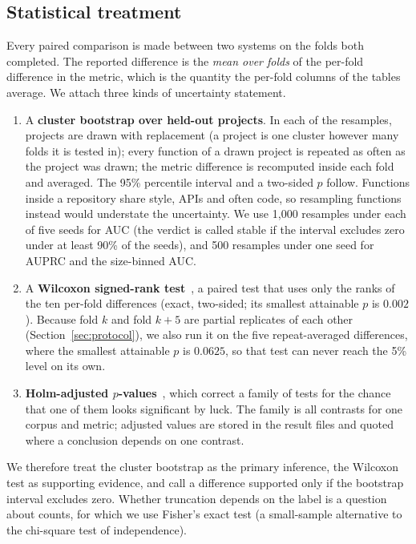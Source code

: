 \documentclass[pdflatex,sn-basic]{sn-jnl}
\theoremstyle{thmstyleone}%
\begin{document}
\subsection{Statistical treatment}
\label{sec:stats}
Every paired comparison is made between two systems on the folds both
completed. The reported difference is the \emph{mean over folds} of the
per-fold difference in the metric, which is the quantity the per-fold columns of
the tables average. We attach three kinds of uncertainty statement.
\begin{enumerate}
    \item A \textbf{cluster bootstrap over held-out projects}. In each of the
          resamples, projects are drawn with replacement (a project is one
          cluster however many folds it is tested in); every function of a drawn
          project is repeated as often as the project was drawn; the metric
          difference is recomputed inside each fold and averaged. The 95\%
          percentile interval and a two-sided $p$ follow. Functions inside a
          repository share style, APIs and often code, so resampling functions
          instead would understate the uncertainty. We use 1{,}000 resamples
          under each of five seeds for AUC (the verdict is called stable if the
          interval excludes zero under at least 90\% of the seeds), and 500
          resamples under one seed for AUPRC and the size-binned AUC.
    \item A \textbf{Wilcoxon signed-rank test}~\citep{wilcoxon1945individual}, a
          paired test that uses only the ranks of the ten per-fold differences
          (exact, two-sided; its smallest attainable $p$ is $0.002$). Because
          fold $k$ and fold $k+5$ are partial replicates of each other
          (Section~\ref{sec:protocol}), we also run it on the five
          repeat-averaged differences, where the smallest attainable $p$ is
          $0.0625$, so that test can never reach the 5\% level on its own.
    \item \textbf{Holm-adjusted $p$-values}~\citep{holm1979simple}, which
          correct a family of tests for the chance that one of them looks
          significant by luck. The family is all contrasts for one corpus and
          metric; adjusted values are stored in the result files and quoted where
          a conclusion depends on one contrast.
\end{enumerate}
We therefore treat the cluster bootstrap as the primary inference, the Wilcoxon
test as supporting evidence, and call a difference supported only if the
bootstrap interval excludes zero. Whether truncation depends on the label is a
question about counts, for which we use Fisher's exact test (a small-sample
alternative to the chi-square test of independence).
\end{document}
